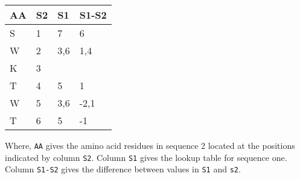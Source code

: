 \begin{minipage}[t]{0.5\textwidth}
  {\small
    \setlength{\tabcolsep}{0.5em}
    \begin{tabular}[t]{l|ll|l}
      AA & S2 & S1 & S1-S2 \\
      \hline
      S & 1 & 7 & 6\\
      W & 2 & 3,6 & 1,4\\
      K & 3 & & \\
      T & 4 & 5 & 1\\
      W & 5 & 3,6 & -2,1\\
      T & 6 & 5 & -1\\
    \end{tabular}
  }
\end{minipage} 
\begin{minipage}[t]{0.5\textwidth}
  {\small
  Where, \texttt{AA} gives the amino acid residues in sequence 2 located at
  the positions indicated by column \texttt{S2}. Column \texttt{S1} gives
  the lookup table for sequence one. Column \texttt{S1-S2} gives the
  difference between values in \texttt{S1} and \texttt{s2}.
  }
\end{minipage}
  
